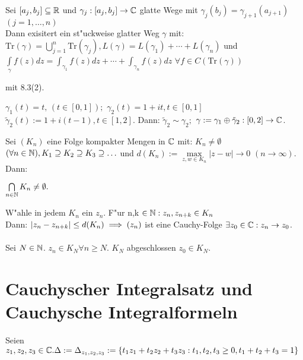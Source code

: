 \documentclass[a4paper,twoside,DIV15,BCOR12mm]{scrbook}
\def\Tr{\text{Tr}}
\def\wegint{\ensuremath{\int\limits_\gamma}}
\def\iint{\ensuremath{\int\limits}}
\begin{document}
\begin{samepage}\begin{satz}
   Sei $[a_j,b_j]\subseteq \mathbb{R}$ und $\gamma_j:[a_j,b_j]\to\mathbb{C}$ glatte Wege mit $\gamma_j(b_j)=\gamma_{j+1}(a_{j+1}) $ $ (j=1,\ldots,n)$ \\
   Dann exisitert ein st"uckweise glatter Weg $\gamma$ mit: $\Tr(\gamma) = \bigcup\limits_{j=1}^n \Tr(\gamma_j),L(\gamma)=L(\gamma_1)+\cdots+L(\gamma_n)$ und $\wegint f(z)dz = \iint_{\gamma_1} f(z)dz+\cdots+\iint_{\gamma_n} f(z)dz $ $\forall f\in C(\Tr(\gamma))$
   
\end{satz}\end{samepage}

\begin{beweis}
mit 8.3(2).
\end{beweis}
\begin{beispiel}
$\gamma_1(t)=t, \,(t\in[0,1]);$ $\gamma_2(t)=1+it, t\in[0,1]$\\
$\tilde\gamma_2(t):=1+i(t-1), t\in[1,2]$. Dann: $\tilde\gamma_2 \sim \gamma_2;$ $\gamma:=\gamma_1\oplus\tilde\gamma_2:[0,2]\to\mathbb{C}$.
\end{beispiel}

\begin{samepage}\begin{satz}
  Sei $(K_n)$ eine Folge kompakter Mengen in $\mathbb{C}$ mit: $K_n\neq\emptyset $ $ (\forall n\in\mathbb{N}), K_1\supseteq K_2\supseteq K_3\supseteq \ldots$ und $d(K_n):=\max\limits_{z,w\in K_n}|z-w| \to 0 $ $(n\to\infty)$. Dann: \\
  \centerline{ $\bigcap\limits_{n\in\mathbb{N}} K_n \neq \emptyset.$}
\end{satz}\end{samepage}
\begin{beweis}
W"ahle in jedem $K_n$ ein $z_n$. F"ur n,k $\in \mathbb{N}:z_n,z_{n+k}\in K_n$\\
Dann: $|z_n-z_{n+k}|\leq d(K_n) \implies (z_n)$ ist eine Cauchy-Folge \folgt $\exists z_0\in\mathbb{C}:z_n\to z_0$.\\ \\
Sei $N\in\mathbb{N}$. $z_n \in K_N \forall n\ge N$. $K_N$ abgeschlossen \folgt $z_0\in K_N$.
\end{beweis}

\chapter{Cauchyscher Integralsatz und Cauchysche Integralformeln} 
\begin{definition}
Seien $z_1,z_2,z_3 \in \mathbb{C}. \Delta := \Delta_{z_1,z_2,z_3} := \{t_1z_1+t_2z_2+t_3z_3: t_1,t_2,t_3 \geq 0, t_1+t_2+t_3 = 1 \}$
\end{definition}
\end{document}

